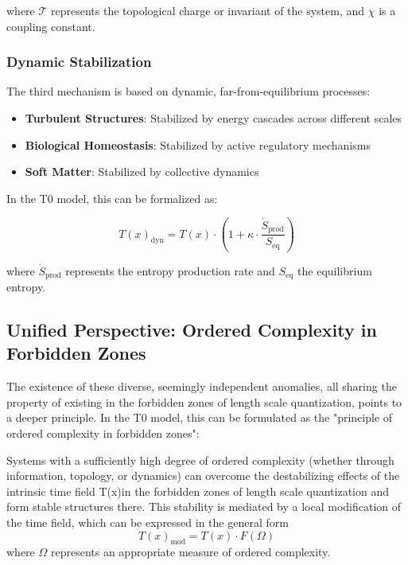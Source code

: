 \documentclass[12pt,a4paper]{article}
\newcommand{\Tfield}{T(x)}
\begin{document}
	where $\mathcal{T}$ represents the topological charge or invariant of the system, and $\chi$ is a coupling constant.
	
	\subsubsection{Dynamic Stabilization}
	\label{subsubsec:dyn_stabilisierung}
	
	The third mechanism is based on dynamic, far-from-equilibrium processes:
	
	\begin{itemize}
		\item \textbf{Turbulent Structures}: Stabilized by energy cascades across different scales
		\item \textbf{Biological Homeostasis}: Stabilized by active regulatory mechanisms
		\item \textbf{Soft Matter}: Stabilized by collective dynamics
	\end{itemize}
	
	In the T0 model, this can be formalized as:
	
	\begin{equation}
		\Tfield_{\text{dyn}} = \Tfield \cdot \left(1 + \kappa \cdot \frac{\dot{S}_{\text{prod}}}{S_{\text{eq}}}\right)
	\end{equation}
	
	where $\dot{S}_{\text{prod}}$ represents the entropy production rate and $S_{\text{eq}}$ the equilibrium entropy.
	
	\subsection{Unified Perspective: Ordered Complexity in Forbidden Zones}
	\label{subsec:geordnete_komplexitaet}
	
	The existence of these diverse, seemingly independent anomalies, all sharing the property of existing in the forbidden zones of length scale quantization, points to a deeper principle. In the T0 model, this can be formulated as the "principle of ordered complexity in forbidden zones":
	
	\begin{tcolorbox}[colback=blue!5!white,colframe=blue!75!black,title=Principle of Ordered Complexity in Forbidden Zones]
		Systems with a sufficiently high degree of ordered complexity (whether through information, topology, or dynamics) can overcome the destabilizing effects of the intrinsic time field \Tfield in the forbidden zones of length scale quantization and form stable structures there. This stability is mediated by a local modification of the time field, which can be expressed in the general form
		\begin{equation}
			\Tfield_{\text{mod}} = \Tfield \cdot F(\Omega)
		\end{equation}
		where $\Omega$ represents an appropriate measure of ordered complexity.
	\end{tcolorbox}
	
\end{document}
